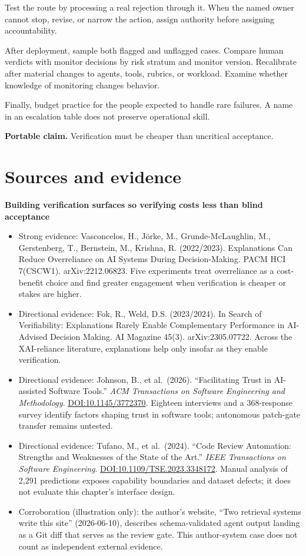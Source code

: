 Test the route by processing a real rejection through it. When the named owner cannot stop, revise, or narrow the action, assign authority before assigning accountability.

After deployment, sample both flagged and unflagged cases. Compare human verdicts with monitor decisions by risk stratum and monitor version. Recalibrate after material changes to agents, tools, rubrics, or workload. Examine whether knowledge of monitoring changes behavior.

Finally, budget practice for the people expected to handle rare failures. A name in an escalation table does not preserve operational skill.

\textbf{Portable claim.} Verification must be cheaper than uncritical acceptance.

\section*{Sources and evidence}

\textbf{Building verification surfaces so verifying costs less than blind acceptance}

\begin{itemize}
\tightlist
\item
  Strong evidence: Vasconcelos, H., Jörke, M., Grunde-McLaughlin, M., Gerstenberg, T., Bernstein, M., Krishna, R. (2022/2023). Explanations Can Reduce Overreliance on AI Systems During Decision-Making. PACM HCI 7(CSCW1). arXiv:2212.06823. Five experiments treat overreliance as a cost-benefit choice and find greater engagement when verification is cheaper or stakes are higher.
\item
  Directional evidence: Fok, R., Weld, D.S. (2023/2024). In Search of Verifiability: Explanations Rarely Enable Complementary Performance in AI-Advised Decision Making. AI Magazine 45(3). arXiv:2305.07722. Across the XAI-reliance literature, explanations help only insofar as they enable verification.
\item
  Directional evidence: Johnson, B., et al.~(2026). ``Facilitating Trust in AI-assisted Software Tools.'' \emph{ACM Transactions on Software Engineering and Methodology}. \href{https://doi.org/10.1145/3772370}{DOI:10.1145/3772370}. Eighteen interviews and a 368-response survey identify factors shaping trust in software tools; autonomous patch-gate transfer remains untested.
\item
  Directional evidence: Tufano, M., et al.~(2024). ``Code Review Automation: Strengths and Weaknesses of the State of the Art.'' \emph{IEEE Transactions on Software Engineering}. \href{https://doi.org/10.1109/TSE.2023.3348172}{DOI:10.1109/TSE.2023.3348172}. Manual analysis of 2,291 predictions exposes capability boundaries and dataset defects; it does not evaluate this chapter's interface design.
\item
  Corroboration (illustration only): the author's website, ``Two retrieval systems write this site'' (2026-06-10), describes schema-validated agent output landing as a Git diff that serves as the review gate. This author-system case does not count as independent external evidence.
\end{itemize}

